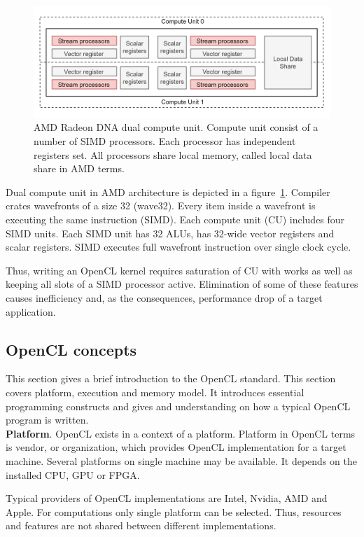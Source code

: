 \begin{figure}[h]
    \centering
    \includegraphics[width=1.0\textwidth]{images/rdna_dcu.png}
    \caption{AMD Radeon DNA dual compute unit. Compute unit consist of a number of SIMD processors. Each processor has independent registers set. All processors share local memory, called local data share in AMD terms.}
    \label{fig:rdna_dcu}
\end{figure}

Dual compute unit in AMD architecture is depicted in a figure~\ref{fig:rdna_dcu}. Compiler crates wavefronts of a size 32 (wave32). Every item inside a wavefront is executing the same instruction (SIMD). Each compute unit (CU) includes four SIMD units. Each SIMD unit has 32 ALUs, has 32-wide vector registers and scalar registers. SIMD executes full wavefront instruction over single clock cycle.

Thus, writing an OpenCL kernel requires saturation of CU with works as well as keeping all slots of a SIMD processor active. Elimination of some of these features causes inefficiency and, as the consequences, performance drop of a target application.

\subsection{OpenCL concepts}

This section gives a brief introduction to the OpenCL standard. This section covers platform, execution and memory model. It introduces essential programming constructs and gives and understanding on how a typical OpenCL program is written.\\

\textbf{Platform}. OpenCL exists in a context of a platform. Platform in OpenCL terms is vendor, or organization, which provides OpenCL implementation for a target machine. Several platforms on single machine may be available. It depends on the installed CPU, GPU or FPGA. 

Typical providers of OpenCL implementations are Intel, Nvidia, AMD and Apple. For computations only single platform can be selected. Thus, resources and features are not shared between different implementations.

